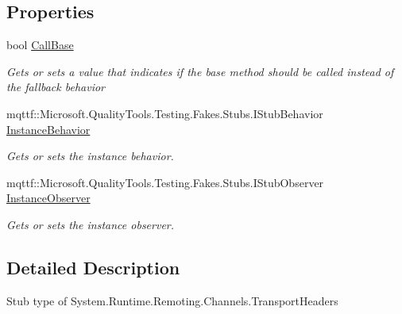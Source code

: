 \subsection*{Properties}
\begin{DoxyCompactItemize}
\item 
bool \hyperlink{class_system_1_1_runtime_1_1_remoting_1_1_channels_1_1_fakes_1_1_stub_transport_headers_a41b14ce1f4cc252e7f4859871824ec18}{Call\-Base}
\begin{DoxyCompactList}\small\item\em Gets or sets a value that indicates if the base method should be called instead of the fallback behavior\end{DoxyCompactList}\item 
mqttf\-::\-Microsoft.\-Quality\-Tools.\-Testing.\-Fakes.\-Stubs.\-I\-Stub\-Behavior \hyperlink{class_system_1_1_runtime_1_1_remoting_1_1_channels_1_1_fakes_1_1_stub_transport_headers_a2d96cc26b63181255eae06741080b7de}{Instance\-Behavior}
\begin{DoxyCompactList}\small\item\em Gets or sets the instance behavior.\end{DoxyCompactList}\item 
mqttf\-::\-Microsoft.\-Quality\-Tools.\-Testing.\-Fakes.\-Stubs.\-I\-Stub\-Observer \hyperlink{class_system_1_1_runtime_1_1_remoting_1_1_channels_1_1_fakes_1_1_stub_transport_headers_a3635eb4a465019d86e8a3e3fb7fb7947}{Instance\-Observer}
\begin{DoxyCompactList}\small\item\em Gets or sets the instance observer.\end{DoxyCompactList}\end{DoxyCompactItemize}


\subsection{Detailed Description}
Stub type of System.\-Runtime.\-Remoting.\-Channels.\-Transport\-Headers



